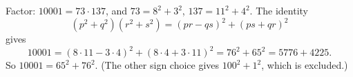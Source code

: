 Factor: $10001=73\cdot137$, and $73=8^2+3^2$, $137=11^2+4^2$. The identity
\[(p^2+q^2)(r^2+s^2)=(pr-qs)^2+(ps+qr)^2\]
gives
\[10001=(8\cdot11-3\cdot4)^2+(8\cdot4+3\cdot11)^2=76^2+65^2=5776+4225.\]
So $10001=\boxed{65^2+76^2}$. (The other sign choice gives $100^2+1^2$, which is excluded.)
